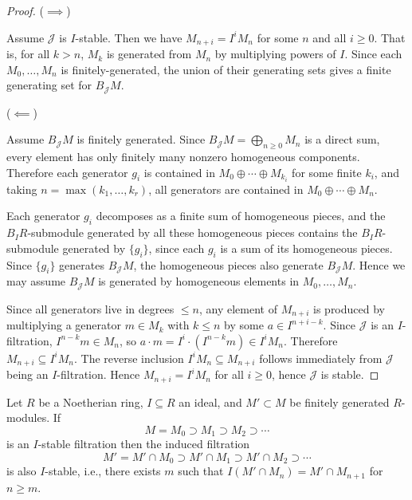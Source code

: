 \documentclass[12pt]{amsproc}
\begin{document}
    \begin{proof}
        \bbni

        ($\implies$)

        Assume $\mathcal{J}$ is $I$-stable. Then we have $M_{n+i} = I^i M_n$ for some $n$ and all $i \geq 0$. That is, for all $k > n$, $M_k$ is generated from $M_n$ by multiplying powers of $I$. Since each $M_0, \ldots, M_n$ is finitely-generated, the union of their generating sets gives a finite generating set for $B_{\mathcal{J}}M$. 

        ($\impliedby$)

        Assume $B_{\mathcal{J}}M$ is finitely generated. Since $B_{\mathcal{J}}M = \bigoplus_{n \geq 0} M_n$ is a direct sum, every element has only finitely many nonzero homogeneous components. Therefore each generator $g_i$ is contained in $M_0 \oplus \cdots \oplus M_{k_i}$ for some finite $k_i$, and taking $n = \max(k_1, \ldots, k_r)$, all generators are contained in $M_0 \oplus \cdots \oplus M_n$. 
        
        Each generator $g_i$ decomposes as a finite sum of homogeneous pieces, and the $B_IR$-submodule generated by all these homogeneous pieces contains the $B_IR$-submodule generated by $\{g_i\}$, since each $g_i$ is a sum of its homogeneous pieces. Since $\{g_i\}$ generates $B_{\mathcal{J}}M$, the homogeneous pieces also generate $B_{\mathcal{J}}M$. Hence we may assume $B_{\mathcal{J}}M$ is generated by homogeneous elements in $M_0, \ldots, M_n$.

        Since all generators live in degrees $\leq n$, any element of $M_{n+i}$ is produced by multiplying a generator $m \in M_k$ with $k \leq n$ by some $a \in I^{n+i-k}$. Since $\mathcal{J}$ is an $I$-filtration, $I^{n-k} m \in M_n$, so $a \cdot m = I^i \cdot (I^{n-k} m) \in I^i M_n$. Therefore $M_{n+i} \subseteq I^i M_n$. The reverse inclusion $I^i M_n \subseteq M_{n+i}$ follows immediately from $\mathcal{J}$ being an $I$-filtration. Hence $M_{n+i} = I^i M_n$ for all $i \geq 0$, hence $\mathcal{J}$ is stable. 
    \end{proof}


    \begin{lemma}
        Let $R$ be a Noetherian ring, $I \subseteq R$ an ideal, and $M' \subset M$ be finitely generated $R$-modules. If
        \[M = M_0 \supset M_1 \supset M_2 \supset \cdots\]
        is an $I$-stable filtration then the induced filtration
        \[M' = M' \cap M_0 \supset M' \cap  M_1 \supset M' \cap  M_2 \supset \cdots\]
        is also $I$-stable, i.e., there exists $m$ such that $I(M' \cap M_n) = M' \cap M_{n+1}$ for $n \geq m$. 
    \end{lemma}
\end{document}
